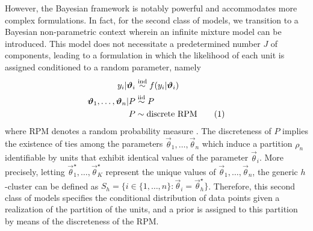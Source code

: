 \documentclass[12pt,	%
	a4paper,		%
	twoside,		%
	openright,		%
	titlepage,%
	]{book}
\newcommand\numberthis{\addtocounter{equation}{1}\tag{\theequation}}
\theoremstyle{definition}
\let\cite\citep
\begin{document}
However, the Bayesian framework is notably powerful and accommodates more complex formulations. In fact, for the second class of models, we transition to a Bayesian non-parametric context wherein an infinite mixture model can be introduced. This model does not necessitate a predetermined number $J$ of components, leading to a formulation in which the likelihood of each unit is assigned conditioned to a random parameter, namely
\begin{align*}
    y_i|\vec{\theta}_i & \simind f(y_i|\vec{\theta}_i)\\
    \vec{\theta}_1, \ldots, \vec{\theta}_n|P & \simiid P\\
    P & \sim \text{discrete RPM} 
    \numberthis \label{mixture nonparam}
\end{align*}
where RPM denotes a random probability measure \cite{paper-33}. The discreteness of $P$ implies the existence of ties among the parameters $\vec{\theta}_1, \ldots, \vec{\theta}_n$ which induce a partition $\rho_n$ identifiable by units that exhibit identical values of the parameter $\vec{\theta}_i$. More precisely, letting $\vec{\theta}_1^\star, \ldots, \vec{\theta}_K^\star$ represent the unique values of $ \vec{\theta}_1, \ldots, \vec{\theta}_n$, the generic $h$-cluster can be defined as $S_h=\{ i \in \{1,\ldots,n\} : \vec{\theta}_i = \vec{\theta}_h^\star \}$. 
Therefore, this second class of models specifies the conditional distribution of data points given a realization of the partition of the units, and a prior is assigned to this partition by means of the discreteness of the RPM.
\end{document}
